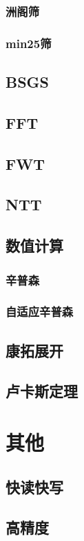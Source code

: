 \documentclass[twocolumn,a4]{article}
\newcommand{\addcpp}[1]{}
\begin{document}
		\subsubsection{洲阁筛}
		\subsubsection{min25筛}
	\subsection{BSGS}
	\subsection{FFT}
	\subsection{FWT}
	\subsection{NTT}
	\subsection{数值计算}
		\subsubsection{辛普森}
		\subsubsection{自适应辛普森}
			\addcpp{math/adaptive_simpson}
	\subsection{康拓展开}
	\subsection{卢卡斯定理}

\section{其他}
	\subsection{快读快写}
	\subsection{高精度}
		\addcpp{other/big_num}
\end{document}
